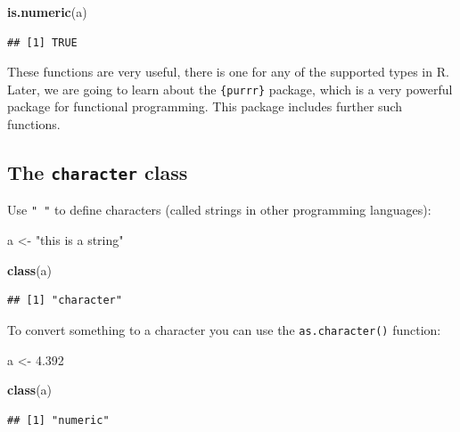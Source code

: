 \documentclass[]{gitbook}
\newenvironment{Shaded}{\begin{snugshade}}{\end{snugshade}}
\newcommand{\FloatTok}[1]{\textcolor[rgb]{0.00,0.00,0.81}{#1}}
\newcommand{\KeywordTok}[1]{\textcolor[rgb]{0.13,0.29,0.53}{\textbf{#1}}}
\newcommand{\NormalTok}[1]{#1}
\newcommand{\StringTok}[1]{\textcolor[rgb]{0.31,0.60,0.02}{#1}}
\begin{document}
\begin{Shaded}
\begin{Highlighting}[]
\KeywordTok{is.numeric}\NormalTok{(a)}
\end{Highlighting}
\end{Shaded}

\begin{verbatim}
## [1] TRUE
\end{verbatim}

These functions are very useful, there is one for any of the supported types in R. Later, we are going
to learn about the \texttt{\{purrr\}} package, which is a very powerful package for functional programming. This
package includes further such functions.

\hypertarget{the-character-class}{%
\subsection{\texorpdfstring{The \texttt{character} class}{The character class}}\label{the-character-class}}

Use \texttt{"\ "} to define characters (called strings in other programming languages):

\begin{Shaded}
\begin{Highlighting}[]
\NormalTok{a <-}\StringTok{ "this is a string"}
\end{Highlighting}
\end{Shaded}

\begin{Shaded}
\begin{Highlighting}[]
\KeywordTok{class}\NormalTok{(a)}
\end{Highlighting}
\end{Shaded}

\begin{verbatim}
## [1] "character"
\end{verbatim}

To convert something to a character you can use the \texttt{as.character()} function:

\begin{Shaded}
\begin{Highlighting}[]
\NormalTok{a <-}\StringTok{ }\FloatTok{4.392}

\KeywordTok{class}\NormalTok{(a)}
\end{Highlighting}
\end{Shaded}

\begin{verbatim}
## [1] "numeric"
\end{verbatim}
\end{document}
